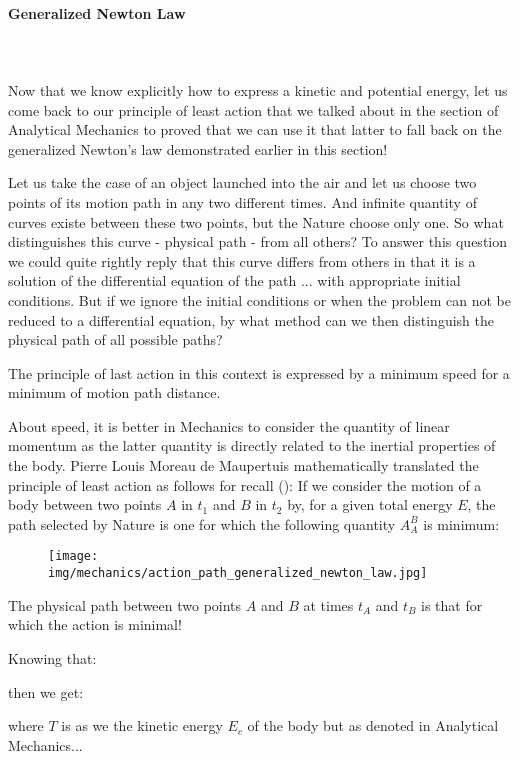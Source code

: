 	\pagebreak
	\paragraph{Generalized Newton Law}\mbox{}\\\\
	Now that we know explicitly how to express a kinetic and potential energy, let us come back to our principle of least action that we talked about in the section of Analytical Mechanics to proved that we can use it that latter to fall back on the generalized Newton's law demonstrated earlier in this section!
	
	Let us take the case of an object launched into the air and let us choose two points of its motion path in any two different times. And infinite quantity of curves existe between these two points, but the Nature choose only one. So what distinguishes this curve - physical path - from all others? To answer this question we could quite rightly reply that this curve differs from others in that it is a solution of the differential equation of the path ... with appropriate initial conditions. But if we ignore the initial conditions or when the problem can not be reduced to a differential equation, by what method can we then distinguish the physical path of all possible paths?
	
	The principle of last action in this context is expressed by a minimum speed for a minimum of motion path distance.

	About speed, it is better in Mechanics to consider the quantity of linear momentum as the latter quantity is directly related to the inertial properties of the body. Pierre Louis Moreau de Maupertuis mathematically translated the principle of least action as follows for recall (): If we consider the motion of a body between two points $A$ in $t_1$ and $B$ in $t_2$ by, for a given total energy $E$, the path selected by Nature is one for which the following quantity $A_A^B$ is minimum:
	
	\begin{figure}[H]
		\centering
		\texttt{[image: img/mechanics/action\_path\_generalized\_newton\_law.jpg]}
	\end{figure}
	The physical path between two points $A$ and $B$ at times $t_A$ and $t_B$ is that for which the action is minimal!

	Knowing that:
	
	then we get:
	
	where $T$ is as we the kinetic energy $E_c$ of the body but as denoted in Analytical Mechanics...
	
